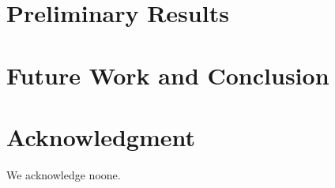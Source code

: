 \documentclass[conference]{IEEEtran}
\begin{document}
%
%
%


\section{Preliminary Results}

%

\section{Future Work and Conclusion}





\section*{Acknowledgment}
We acknowledge noone.



\end{document}
